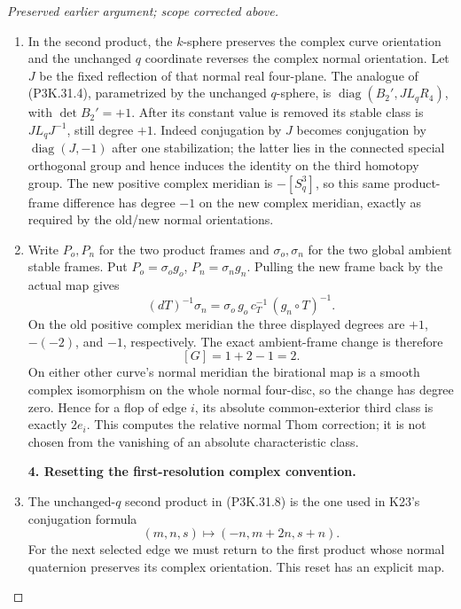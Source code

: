 \begin{proof}[Preserved earlier argument; scope corrected above]
\begin{enumerate}[label=\arabic*.]
\item In the second product, the \(k\)-sphere preserves the
complex curve orientation and the unchanged \(q\)
coordinate reverses the complex normal orientation.
Let \(J\) be the fixed reflection of that normal real
four-plane. The analogue of (P3K.31.4), parametrized by
the unchanged \(q\)-sphere, is
\(\operatorname{diag}(B_2',J L_qR_4)\), with
\(\det B_2'=+1\).
After its constant value is removed its stable class
is \(J L_qJ^{-1}\), still degree \(+1\).
Indeed conjugation by \(J\) becomes conjugation by
\(\operatorname{diag}(J,-1)\) after one stabilization;
the latter lies in the connected special orthogonal
group and hence induces the identity on the third
homotopy group. The new positive complex meridian is
\(-[S^3_q]\), so this same product-frame difference has
degree \(-1\) on the new complex meridian, exactly as
required by the old/new normal orientations.

\item Write \(P_o,P_n\) for the two product frames and
\(\sigma_o,\sigma_n\) for the two global ambient stable
frames. Put \(P_o=\sigma_og_o\), \(P_n=\sigma_ng_n\).
Pulling the new frame back by the actual map gives
\[
 (dT)^{-1}\sigma_n
       =\sigma_o\,g_o\,c_T^{-1}\,(g_n\circ T)^{-1}.
                                                        \tag{P3K.31.10}
\]
On the old positive complex meridian the three displayed
degrees are \(+1\), \(-(-2)\), and \(-1\), respectively.
The exact ambient-frame change is therefore
\[
                         [G]=1+2-1=2.
                                                        \tag{P3K.31.11}
\]
On either other curve's normal meridian the birational
map is a smooth complex isomorphism on the whole normal
four-disc, so the change has degree zero. Hence for a
flop of edge \(i\), its absolute common-exterior third
class is exactly \(2e_i\). This computes the relative
normal Thom correction; it is not chosen from the
vanishing of an absolute characteristic class.

\par\medskip\noindent\textbf{4. Resetting the first-resolution complex convention.}\enspace

\item The unchanged-\(q\) second product in (P3K.31.8) is the one
used in K23's conjugation formula
\[
             (m,n,s)\longmapsto(-n,m+2n,s+n).
                                                        \tag{P3K.31.12}
\]
For the next selected edge we must return to the first
product whose normal quaternion preserves its complex
orientation. This reset has an explicit map.


\end{enumerate}
\end{proof}
